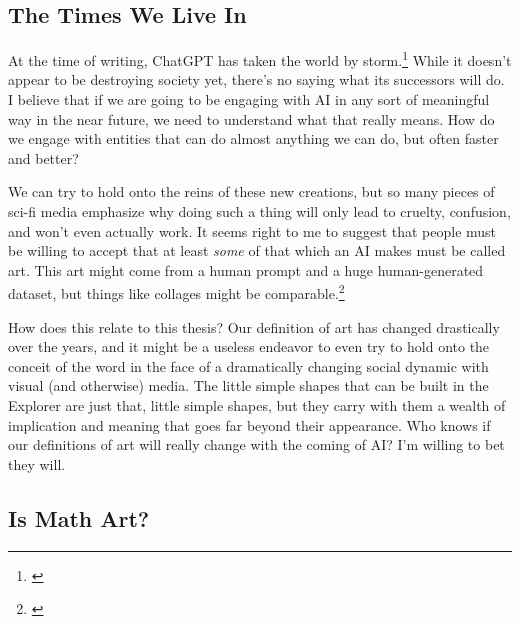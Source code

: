 \documentclass[12pt,twoside]{reedthesis}
\begin{document}
\subsection{The Times We Live In} %
\label{AI-Art}

	At the time of writing, ChatGPT has taken the world by storm.\footnote{\cite{ChatGPT}} While it doesn't appear to be destroying society yet, there's no saying what its successors will do. I believe that if we are going to be engaging with AI in any sort of meaningful way in the near future, we need to understand what that really means. How do we engage with entities that can do almost anything we can do, but often faster and better?
	
	We can try to hold onto the reins of these new creations, but so many pieces of sci-fi media emphasize why doing such a thing will only lead to cruelty, confusion, and won't even actually work. It seems right to me to suggest that people must be willing to accept that at least \textit{some} of that which an AI makes must be called art. This art might come from a human prompt and a huge human-generated dataset, but things like collages might be comparable.\footnote{\cite{NYT2023}}
	
	
	How does this relate to this thesis? Our definition of art has changed drastically over the years, and it might be a useless endeavor to even try to hold onto the conceit of the word in the face of a dramatically changing social dynamic with visual (and otherwise) media. The little simple shapes that can be built in the Explorer are just that, little simple shapes, but they carry with them a wealth of implication and meaning that goes far beyond their appearance. Who knows if our definitions of art will really change with the coming of AI? I'm willing to bet they will.

\subsection{Is Math Art?}
\end{document}
